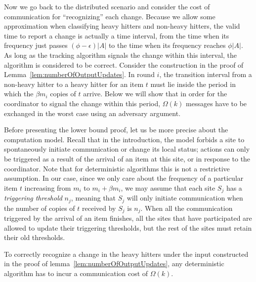 \documentclass[10pt]{article}
\newcommand{\eps}{\epsilon}
\begin{document}
Now we go back to the distributed scenario and consider the cost of
communication for ``recognizing'' each change. Because we allow some
approximation when classifying heavy hitters and non-heavy hitters, the
valid time to report a change is actually a time interval, from
the time when its frequency just passes $(\phi-\eps)|A|$ to the time when
its frequency reaches $\phi|A|$.  As long as the tracking algorithm signals
the change within this interval, the algorithm is considered to be correct.
Consider the construction in the proof of
Lemma~\ref{lem:numberOfOutputUpdates}.  In round $i$, the transition
interval from a non-heavy hitter to a heavy hitter for an item $t$ must lie
inside the period in which the $\beta m_i$ copies of $t$ arrive.  Below we
will show that in order for the coordinator to signal the change within
this period, $\Omega(k)$ messages have to be exchanged in the worst case
using an adversary argument.

Before presenting the lower bound proof, let us be more precise about
the computation model.  Recall that in the introduction, the model
forbids a site to spontaneously initiate communication or change its
local status; actions can only be triggered as a result of the
arrival of an item at this site, or in response to the coordinator.  Note
that for deterministic algorithms this is not a restrictive
assumption. 
In our case, since we only care about the frequency of a particular
item $t$ increasing from $m_i$ to $m_i+\beta m_i$, we may assume that
each site $S_j$ has a {\em triggering threshold} $n_j$, meaning that
$S_j$ will only initiate communication when the number of copies of
$t$ received by $S_j$ is $n_j$.  When all the communication triggered
by the arrival of an item finishes, all the sites that have
participated are allowed to update their triggering thresholds, but
the rest of the sites must retain their old thresholds.  

\begin{lemma}
\label{lem:costEachUpdate} To correctly recognize a change in
the heavy hitters under the input constructed in the proof of
lemma~\ref{lem:numberOfOutputUpdates}, any deterministic algorithm has to
incur a communication cost of $\Omega(k)$.
\end{lemma}
\end{document}
